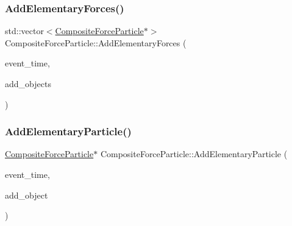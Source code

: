 \subsubsection{\texorpdfstring{Add\+Elementary\+Forces()}{AddElementaryForces()}}
{\footnotesize\ttfamily std\+::vector$<$\mbox{\hyperlink{classCompositeForceParticle}{Composite\+Force\+Particle}}$\ast$$>$ Composite\+Force\+Particle\+::\+Add\+Elementary\+Forces (\begin{DoxyParamCaption}\item[{std\+::chrono\+::time\+\_\+point$<$ \mbox{\hyperlink{universe_8h_a0ef8d951d1ca5ab3cfaf7ab4c7a6fd80}{Clock}} $>$}]{event\+\_\+time,  }\item[{std\+::vector$<$ \mbox{\hyperlink{classCompositeForceParticle}{Composite\+Force\+Particle}} $\ast$$>$}]{add\+\_\+objects }\end{DoxyParamCaption})}

\mbox{\label{classCompositeForceParticle_a27924093abdaa2f19902a32a068fa324}} 
\subsubsection{\texorpdfstring{Add\+Elementary\+Particle()}{AddElementaryParticle()}}
{\footnotesize\ttfamily \mbox{\hyperlink{classCompositeForceParticle}{Composite\+Force\+Particle}}$\ast$ Composite\+Force\+Particle\+::\+Add\+Elementary\+Particle (\begin{DoxyParamCaption}\item[{std\+::chrono\+::time\+\_\+point$<$ \mbox{\hyperlink{universe_8h_a0ef8d951d1ca5ab3cfaf7ab4c7a6fd80}{Clock}} $>$}]{event\+\_\+time,  }\item[{\mbox{\hyperlink{classCompositeForceParticle}{Composite\+Force\+Particle}} $\ast$}]{add\+\_\+object }\end{DoxyParamCaption})}

\mbox{\label{classCompositeForceParticle_a2b88f000067b5d430d1850e75b733f56}} 
